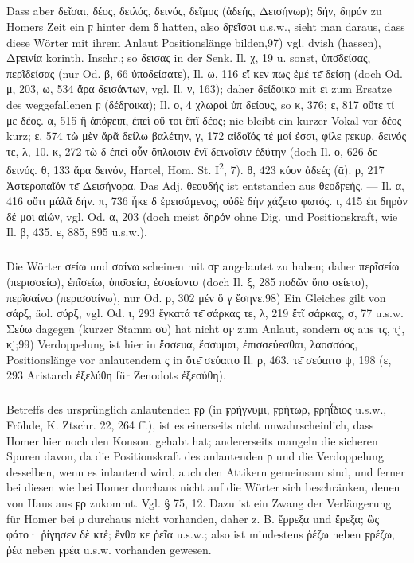 {\small\noindent\subparagraph{} Dass aber δεῖσαι, δέος, δειλός, δεινός, δεῖμος
  (ἀδεής, Δεισήνωρ); δήν, δηρόν zu Homers Zeit ein ϝ hinter dem δ hatten, also
  δϝεῖσαι u.s.w., sieht man daraus, dass diese Wörter mit ihrem Anlaut
  Positionslänge bilden,97) vgl.  dvish (hassen), Δϝεινία korinth. Inschr.;
  so δεισας in der Senk. Il. χ, 19 u. sonst, ὑπο̄δείσας, περῖδείσας (nur Od. β,
  66 ὑποδείσατε), Il. ω, 116 εἴ κεν πως ἐμέ τε̄ δείσῃ (doch Od. μ, 203, ω, 534
  ἄρα δεισάντων, vgl. Il. ν, 163); daher δείδοικα mit ει zum Ersatze des
  weggefallenen ϝ (δέδϝοικα); Il. ο, 4 χλωροὶ ὑπ δείους, so κ, 376; ε, 817 οὔτε
  τί με̄ δέος. α, 515 ἢ ἀπόϝειπ, ἐπεὶ οὔ τοι ἔπῖ δέος; nie bleibt ein kurzer
  Vokal vor δέος kurz; ε, 574 τὼ μὲν ἄρᾶ δείλω βαλέτην, γ, 172 αἰδοῖός τέ μοί
  ἐσσι, φίλε ϝεκυρ, δεινός τε, λ, 10. κ, 272 τὼ δ ἐπεὶ οὖν ὅπλοισιν ἔνῖ
  δεινοῖσιν ἐδύτην (doch Il. ο, 626 δε δεινός. θ, 133 ἄρα δεινόν, Hartel, Hom.
  St. I\textsuperscript{2}, 7). θ, 423 κύον ἀδεές (ᾱ). ρ, 217 Ἀστεροπαῖόν τε̄
  Δεισήνορα. Das Adj. θεουδής ist entstanden aus θεοδϝεής. — Il. α, 416 οὔτι
  μάλᾶ δήν. π, 736 ἧκε δ ἐρεισάμενος, οὐδὲ δὴν χάζετο φωτός. ι, 415 ἐπ δηρὸν δέ
  μοι αἰών, vgl. Od. α, 203 (doch meist δηρόν ohne Dig. und Positionskraft, wie
Il. β, 435. ε, 885, 895 u.s.w.). }

{\small\noindent\subparagraph{} Die Wörter σείω und σαίνω scheinen mit σϝ
  angelautet zu haben; daher περῖσείω (περισσείω), ἐπῖσείω, ὑπο̄σείω, ἐσσείοντο
  (doch Il. ξ, 285 ποδῶν ὕπο σείετο), περῖσαίνω (περισσαίνω), nur Od. ρ, 302 μέν
  ὅ γ ἔσηνε.98) Ein Gleiches gilt von σάρξ, äol. σύρξ, vgl. Od. ι, 293 ἔγκατά τε̄
  σάρκας τε, λ, 219 ἔτῖ σάρκας, σ, 77 u.s.w. Σεύω dagegen (kurzer Stamm συ)
  hat nicht σϝ zum Anlaut, sondern σς aus τς, τj, κj;99) Verdoppelung ist hier
  in ἔσσευα, ἔσσυμαι, ἐπισσεύεσθαι, λαοσσόος, Positionslänge vor anlautendem ς
  in ὅτε̄ σεύαιτο Il. ρ, 463. τε̄ σεύαιτο ψ, 198 (ε, 293 Aristarch ἐξελύθη für
Zenodots ἐξεσύθη). }

{\small\noindent\subparagraph{} Betreffs des ursprünglich anlautenden ϝρ (in
  ϝρήγνυμι, ϝρήτωρ, ϝρηΐδιος u.s.w., Fröhde, K. Ztschr. 22, 264 ff.), ist es
  einerseits nicht unwahrscheinlich, dass Homer hier noch den Konson. gehabt
  hat; andererseits mangeln die sicheren Spuren davon, da die Positionskraft des
  anlautenden ρ und die Verdoppelung desselben, wenn es inlautend wird, auch den
  Attikern gemeinsam sind, und ferner bei diesen wie bei Homer durchaus nicht
  auf die Wörter sich beschränken, denen von Haus aus ϝρ zukommt. Vgl. § 75, 12.
  Dazu ist ein Zwang der Verlängerung für Homer bei ρ durchaus nicht vorhanden,
  daher z. B. ἔρρεξα und ἔρεξα; ὣς φάτο· ῥίγησεν δὲ κτἑ; ἔνθα κε ῥεῖα u.s.w.;
  also ist mindestens ῥέζω neben ϝρέζω, ῥέα neben ϝρέα u.s.w. vorhanden
gewesen. }

